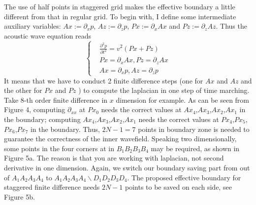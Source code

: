 The use of half points in staggered grid makes the effective boundary a little different from that in regular grid. To begin with, I define some intermediate auxiliary variables: $Ax:=\partial_x p$, $Az:=\partial_z p$, $Px:=\partial_x Ax$ and $Pz:=\partial_z Az$. Thus the acoustic wave equation reads
\begin{equation}\label{eq:acoustic1}
\left\{
\begin{split}
&\frac{\partial^2 p}{\partial t^2}=v^2\left(Px+Pz\right)\\
&Px=\partial_x Ax,Pz=\partial_z Ax\\
&Ax=\partial_x p, Az=\partial_z p
\end{split}
\right.
\end{equation}
It means that we have to conduct 2 finite difference steps (one for $Ax$ and $Az$ and the other for $Px$ and $Pz$ ) to compute the laplacian in one step of time marching. Take 8-th order finite difference in $x$ dimension for example. As can be seen from Figure 4, computing $\partial_{xx}$ at $Px_0$ needs the correct values at $Ax_4$,$Ax_3$,$Ax_2$,$Ax_1$ in the boundary; computing $Ax_4$,$Ax_3$,$Ax_2$,$Ax_1$ needs the correct values at $Px_4$,$Px_5$,$Px_6$,$Px_7$ in the boundary. Thus, $2N-1=7$ points in boundary zone is needed to guarantee the correctness of the inner wavefield. Speaking two dimensionally, some points in the four corners at in $B_1B_2B_3B_4$ may be required, as shown in Figure 5a. The reason is that you are working with laplacian, not second derivative in one dimension. Again, we switch our boundary saving part from out of $A_1A_2A_3A_4$ to $A_1A_2A_3A_4\backslash D_1D_2D_3D_4$. The proposed effective boundary for staggered finite difference needs $2N-1$ points to be saved on each side, see Figure 5b.



